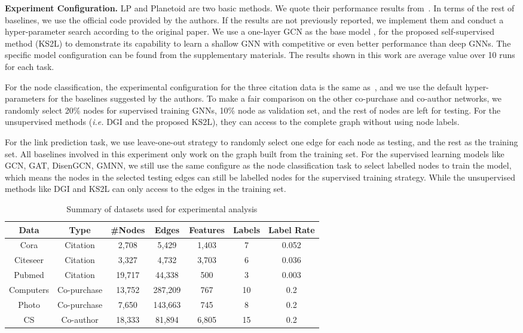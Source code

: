 \documentclass[preprint]{article}
\begin{document}
\textbf{Experiment Configuration.}
LP and  Planetoid are two basic methods.
We quote their performance results from~\cite{kipf2016semi}. 
In terms of the rest of baselines, we use the official code provided by the authors. If the results are not previously reported, we implement them and conduct a hyper-parameter search according to the original paper. We use a one-layer GCN as the base model , for the proposed self-supervised method (KS2L) to demonstrate its capability to learn a shallow GNN with competitive or even better performance than deep GNNs. The specific model configuration can be found from the supplementary materials. The results shown in this work are average value over 10 runs for each task.

For the node classification, the experimental configuration for the three citation data is the same as~\cite{kipf2016semi}, and we use the default hyper-parameters for the baselines suggested by the authors. To make a fair comparison on the other co-purchase and co-author networks, we randomly select 20\% nodes for supervised training GNNs, 10\% node as validation set, and the rest of nodes are left for testing. For the unsupervised methods (\emph{i.e.} DGI and the proposed KS2L), they can access to the complete graph without using node labels.

For the link prediction task, we use leave-one-out strategy to randomly select one edge for each node as testing, and the rest as the training set. All baselines involved in this experiment only work on the graph built from the training set. For the supervised learning models like GCN, GAT, DisenGCN, GMNN, we still use the same configure as the node classification task to select labelled nodes to train the model, which means the nodes in the selected testing edges can still be labelled nodes for the supervised training strategy. While the unsupervised methods like DGI and KS2L can only access to the edges in the training set.

\begin{table}[!tp]
\caption{Summary of datasets used for experimental analysis}
\label{stat:data}
\centering
\footnotesize
\begin{tabular}{c c c c c c c}
\toprule
	\textbf{Data} & \textbf{Type} & \textbf{\#Nodes} & \textbf{Edges} & \textbf{Features} & \textbf{Labels} & \textbf{Label Rate}\\
\midrule
	 Cora & Citation & 2,708 & 5,429 & 1,403 & 7 & 0.052 \\
	 Citeseer & Citation & 3,327 & 4,732 & 3,703 & 6 & 0.036\\
         Pubmed & Citation & 19,717 & 44,338 & 500 & 3 & 0.003 \\
	Computers & Co-purchase & 13,752 & 287,209 & 767 & 10 & 0.2\\
	Photo & Co-purchase & 7,650 & 143,663 & 745 & 8 & 0.2\\
	CS & Co-author & 18,333 & 81,894 & 6,805 & 15 & 0.2\\
\bottomrule
\end{tabular}
\end{table}
\end{document}
